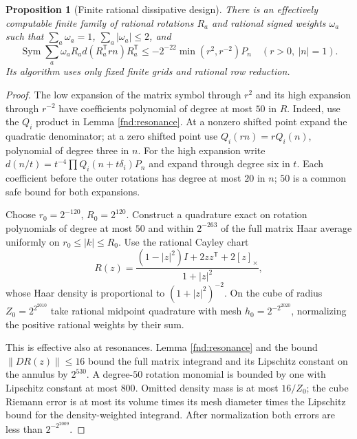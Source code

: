 \documentclass[11pt,a4paper]{amsart}
\newtheorem{proposition}[theorem]{Proposition}
\theoremstyle{definition}
\theoremstyle{remark}
\numberwithin{equation}{section}
\begin{document}
\begin{proposition}[Finite rational dissipative design]\label{fnd:design}
There is an effectively computable finite family of rational rotations $R_a$
and rational signed weights $\omega_a$ such that $\sum_a\omega_a=1$,
$\sum_a|\omega_a|\le2$, and
\begin{equation}
 \operatorname{Sym}\sum_a\omega_aR_a d(R_a^{\mathsf T}rn)R_a^{\mathsf T}
 \le-2^{-22}\min(r^2,r^{-2})P_n
 \quad(r>0,\ |n|=1).
 \label{fnd:finite-design-sign}
\end{equation}
Its algorithm uses only fixed finite grids and rational row reduction.
\end{proposition}
\begin{proof}
The low expansion of the matrix symbol through $r^2$ and its high expansion
through $r^{-2}$ have coefficients polynomial of degree at most $50$ in $R$.
Indeed, use the $Q_i$ product in Lemma \ref{fnd:resonance}. At a nonzero shifted
point expand the quadratic denominator; at a zero shifted point use
$Q_i(rn)=rQ_i(n)$, polynomial of degree three in $n$. For the high expansion
write $d(n/t)=t^{-4}\prod Q_i(n+t\delta_i)P_n$ and expand through degree six
in $t$. Each coefficient before the outer rotations has degree at most $20$
in $n$; $50$ is a common safe bound for both expansions.

Choose $r_0=2^{-120}$, $R_0=2^{120}$. Construct a quadrature exact on rotation
polynomials of degree at most $50$ and within $2^{-263}$ of the full matrix
Haar average uniformly on $r_0\le|k|\le R_0$. Use the rational Cayley chart
\[
 R(z)=\frac{(1-|z|^2)I+2zz^{\mathsf T}+2[z]_\times}{1+|z|^2},
\]
whose Haar density is proportional to $(1+|z|^2)^{-2}$. On the cube of radius
$Z_0=2^{2^{2010}}$ take rational midpoint quadrature with mesh
$h_0=2^{-2^{2020}}$, normalizing the positive rational weights by their sum.

This is effective also at resonances. Lemma \ref{fnd:resonance} and the bound
$\|DR(z)\|\le16$ bound the full matrix integrand and its Lipschitz constant
on the annulus by $2^{530}$. A degree-$50$ rotation monomial is bounded by one
with Lipschitz constant at most $800$. Omitted density mass is at most
$16/Z_0$; the cube Riemann error is at most its volume times its mesh diameter
times the Lipschitz bound for the density-weighted integrand. After
normalization both errors are less than $2^{-2^{2009}}$.


\end{proof}
\end{document}

